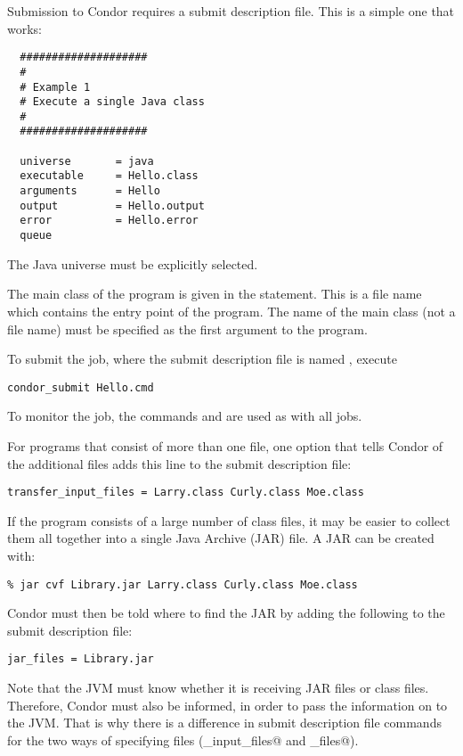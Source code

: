 Submission to Condor requires a submit description file.
This is a simple one that works:

\begin{verbatim}
  ####################
  #
  # Example 1
  # Execute a single Java class
  #
  ####################

  universe       = java
  executable     = Hello.class
  arguments      = Hello
  output         = Hello.output
  error          = Hello.error
  queue
\end{verbatim}

The Java universe must be explicitly selected.

The main class of the program is given in the  statement.
This is a file name which contains the entry point of the program.
The name of the main class (not a file name) must
be specified as the first argument to the program.

To submit the job, where the submit description file
is named , 
execute 
\begin{verbatim}
condor_submit Hello.cmd
\end{verbatim}

To monitor the job, the commands  and 
are used as with all jobs.

For programs that 
consist of more than one  file,
one option that tells Condor of the additional files adds
this line to the submit description file:

\begin{verbatim}
transfer_input_files = Larry.class Curly.class Moe.class
\end{verbatim}

If the program consists of a large number of class files,
it may be easier to collect them all together into
a single Java Archive (JAR) file.
A JAR can be created with:

\begin{verbatim}
% jar cvf Library.jar Larry.class Curly.class Moe.class
\end{verbatim}

Condor must then be told where to find the JAR by
adding the 
following to the submit description file:

\begin{verbatim}
jar_files = Library.jar
\end{verbatim}

Note that the JVM must know whether it is receiving JAR files
or class files.
Therefore, Condor must also be informed, in order to pass the
information on to the JVM.
That is why there is a difference in submit description file commands
for the two ways of specifying files (\verb@transfer_input_files@
and \verb@jar_files@).

